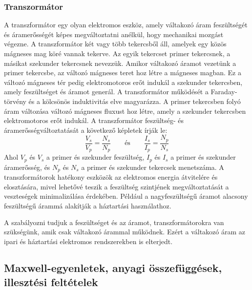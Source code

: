 \documentclass[a4paper,12pt]{article}
\begin{document}
\subsubsection{Transzormátor}
A transzformátor egy olyan elektromos eszköz, amely váltakozó áram feszültségét és áramerősségét képes megváltoztatni anélkül, hogy mechanikai mozgást végezne. A transzformátor két vagy több tekercsből áll, amelyek egy közös mágneses mag köré vannak tekerve. Az egyik tekercset primer tekercsnek, a másikat szekunder tekercsnek nevezzük.
Amikor váltakozó áramot vezetünk a primer tekercsbe, az változó mágneses teret hoz létre a mágneses magban. Ez a változó mágneses tér pedig elektromotoros erőt indukál a szekunder tekercsben, amely feszültséget és áramot generál.
A transzformátor működését a Faraday-törvény és a kölcsönös induktivitás elve magyarázza. A primer tekercsben folyó áram változása változó mágneses fluxust hoz létre, amely a szekunder tekercsben elektromotoros erőt indukál. A transzformátor feszültség- és áramerősségváltoztatását a következő képletek írják le:
\begin{equation}
    \frac{V_s}{V_p} = \frac{N_s}{N_p} \qquad \text{és} \qquad \frac{I_s}{I_p} = \frac{N_p}{N_s}
\end{equation}
Ahol $V_p$ és $V_s$ a primer és szekunder feszültség, $I_p$ és $I_s$ a primer és szekunder áramerősség, és $N_p$ és $N_s$ a primer és szekunder tekercsek menetszáma.
A transzformátorok hatékony eszközök az elektromos energia átvitelére és elosztására, mivel lehetővé teszik a feszültség szintjének megváltoztatását a veszteségek minimalizálása érdekében. Például a nagyfeszültségű áramot alacsony feszültségű árammá alakítják a háztartási használathoz.

A szabályozni tudjuk a feszültséget és az áramot, transzformátorokra van szükségünk, amik csak váltakozó árammal működnek. Ezért a váltakozó áram az ipari és háztartási elektromos rendszerekben is elterjedt.

\subsection{Maxwell-egyenletek, anyagi összefüggések, illesztési feltételek}
\end{document}
